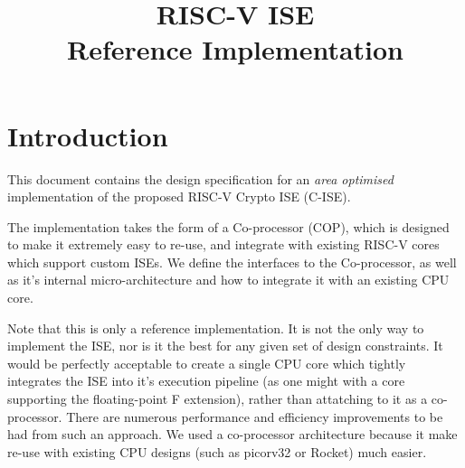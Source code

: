 \documentclass{article}
\title{RISC-V \ISE ISE \\ Reference Implementation}
\begin{document}
\maketitle \tableofcontents



\newcommand{\SIGNALS}[3]{
\begin{table}[H]
\begin{tabularx}{\textwidth}{@{} c c l Y @{}}
\toprule
\textbf{I/O} & \textbf{Size} & \textbf{Name} & \textbf{Description} \\
\midrule
#1
\bottomrule
\end{tabularx}
\caption{#2}
\label{#3}
\end{table}
}

\newcommand{\SIGREF}[1]{{\tt #1}}

\newcommand{\SIGNALI}[3]{
    {\bf I} & $#1$ &{\tt #2}& #3 \\ \addlinespace
}

\newcommand{\SIGNALO}[3]{
    {\bf O} & $#1$ &{\tt #2}& #3 \\ \addlinespace
}

\newcommand{\cpucopif}{\nameref{sec:cpu-cop-if} }


\section{Introduction}

This document contains the design specification for an {\em area optimised}
implementation of the proposed RISC-V Crypto ISE (C-ISE).

The implementation takes the form of a Co-processor (COP), which is designed
to make it extremely easy to re-use, and integrate with existing RISC-V cores
which support custom ISEs. We define the interfaces to the Co-processor, as
well as it's internal micro-architecture and how to integrate it with an
existing CPU core.

Note that this is only a reference implementation. It is not the only way
to implement the ISE, nor is it the best for any given set of design
constraints. It would be perfectly acceptable to create a single CPU core
which tightly integrates the ISE into it's execution pipeline (as one might
with a core supporting the floating-point F extension), rather than
attatching to it as a co-processor. There are numerous performance and
efficiency improvements to be had from such an approach. We used a
co-processor architecture because it make re-use with existing CPU designs
(such as picorv32 or Rocket) much easier.
\end{document}
